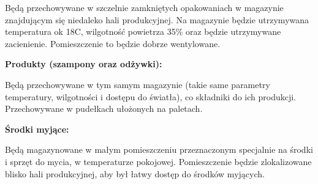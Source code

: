 Będą przechowywane w szczelnie zamkniętych opakowaniach w magazynie znajdującym się niedaleko hali produkcyjnej. Na magazynie będzie utrzymywana temperatura ok 18C, wilgotność powietrza 35\% oraz będzie utrzymywane zacienienie. Pomieszczenie to będzie dobrze wentylowane. \vspace{\baselineskip}

\textbf{Produkty (szampony oraz odżywki):}

Będą przechowywane w tym samym magazynie (takie same parametry temperatury, wilgotności i dostępu do światła), co składniki do ich produkcji. Przechowywane w pudełkach ułożonych na paletach. \vspace{\baselineskip}

\textbf{Środki myjące:}

Będą magazynowane w małym pomieszczeniu przeznaczonym specjalnie na środki i sprzęt do mycia, w temperaturze pokojowej. Pomieszczenie będzie zlokalizowane blisko hali produkcyjnej, aby był łatwy dostęp do środków myjących.

